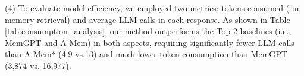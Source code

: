 \documentclass[11pt]{article}
\begin{document}

(4) 
To evaluate model efficiency, we employed two metrics: tokens consumed ( in memory retrieval) and average LLM calls in each response. As shown in Table \ref{tab:consumption_analysis}, our method outperforms the Top-2 baselines (i.e., MemGPT and A-Mem) in both aspects, requiring significantly fewer LLM calls than A-Mem* (4.9 vs.13) and much lower token consumption than MemGPT (3,874 vs. 16,977). 


\end{document}
